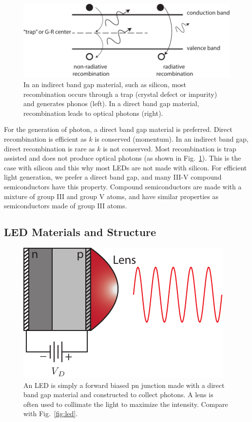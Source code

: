 \begin{figure}[tb]
\begin{center}
\includegraphics[width=.75\columnwidth]{rad_vs_nonrad_reco}
\end{center}
\caption{In an indirect band gap material, such as silicon, most recombination occurs through a trap (crystal defect or impurity) and generates phonos (left).  In a direct band gap material, recombination leads to optical photons (right). } \label{fig:rad_vs_nonrad_reco}
\end{figure}

For the generation of photon, a direct band gap material is preferred.  Direct recombination is efficient as $k$ is conserved (momentum).  In an indirect band gap, direct recombination is rare as $k$ is not conserved.  Most recombination is trap assisted and does not produce optical photons (as shown in Fig.~\ref{fig:rad_vs_nonrad_reco}).  This is the case with silicon and this why most LEDs are not made with silicon. For efficient light generation, we prefer a direct band gap, and many III-V compound semiconductors have this property.  Compound semiconductors are made with a mixture of group III and group V atoms, and have similar properties as semiconductors made of group III atoms.



\subsection{LED Materials and Structure}




\begin{figure}[tb]
\begin{center}
\includegraphics[width=.35\columnwidth]{led_struct}
\end{center}
\caption{An LED is simply a forward biased pn junction made with a direct band gap material and constructed to collect photons.  A lens is often used to collimate the light to maximize the intensity.  Compare with Fig.~\ref{fig:led}. } \label{fig:led_struct}
\end{figure}

